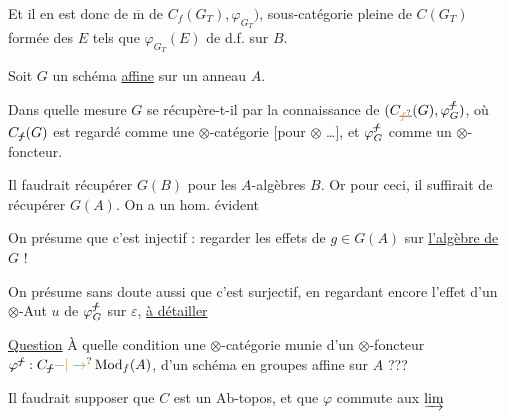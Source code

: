 Et il en est donc de $\overline{\mathrm m}$ de $C_f(G_T),\varphi_{G_T})$, sous-catégorie pleine de $C(G_T)$ formée des $E$ tels que $\varphi_{G_T}(E)$ de d.f. sur $B$.

Soit $G$ un schéma \uline{affine}  sur un anneau $A$.

Dans quelle mesure $G$ se récupère-t-il par la connaissance de $({C}_{\deleted{\unsure{f}}}(G),\varphi_G^{\deleted{f}})$, où $C_{\deleted{f}}(G)$ est regardé comme une $\otimes$-catégorie [pour $\otimes$ \ldots], et $\varphi_G^{\deleted{f}}$ comme un $\otimes$-foncteur.

Il faudrait récupérer $G(B)$ pour les $A$-algèbres $B$. Or pour ceci, il suffirait de récupérer $G(A)$. On a un hom. évident


On présume que c'est injectif : regarder les effets de $g\in G(A)$ \unsure{,} sur \uline{l'algèbre  de} $G$ !

On présume sans doute aussi que c'est surjectif, en regardant encore l'effet d'un $\otimes$-Aut $u$ de $\varphi_G^{\deleted{f}}$ sur $\varepsilon$,  \uline{à détailler}

\uline{Question} À quelle condition une $\otimes$-catégorie  munie d'un $\otimes$-foncteur $\varphi^{\deleted{f}}:C_{\deleted{f}}\unsure{-|\to}\operatorname{Mod}_{f}(A)$,  d'un schéma en groupes affine sur $A$ ???

Il faudrait supposer que $C$ est un Ab-topos, et que $\varphi$ commute aux $\varinjlim$

